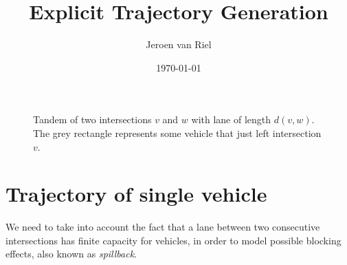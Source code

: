 \documentclass[a4paper]{article}
\author{Jeroen van Riel}
\date{\monthyeardate\today}
\title{Explicit Trajectory Generation}
\theoremstyle{definition}
\theoremstyle{plain}
\begin{document}
\begin{figure}
  \centering
  \caption{Tandem of two intersections $v$ and $w$ with lane of length $d(v,w)$.
    The grey rectangle represents some vehicle that just left intersection $v$.}
  \label{fig:tandem}
\end{figure}

\section*{Trajectory of single vehicle}

We need to take into account the fact that a lane between two consecutive
intersections has finite capacity for vehicles, in order to model possible
blocking effects, also known as \textit{spillback}.
\end{document}
